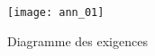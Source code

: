 \begin{figure}[H]
\centering
\texttt{[image: ann\_01]}

\caption{Diagramme des exigences \label{ann_01}}
\end{figure}


%
%
%
%
%
%
